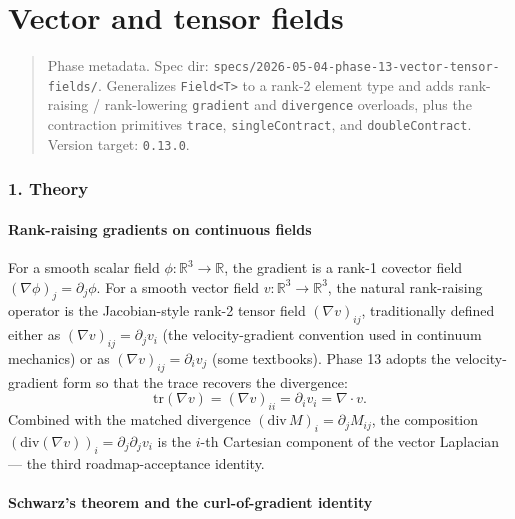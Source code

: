 \chapter{Vector and tensor fields}
\label{chap:dev:vector-tensor-fields}

\begin{quote}
Phase metadata. Spec dir:
\passthrough{\lstinline!specs/2026-05-04-phase-13-vector-tensor-fields/!}.
Generalizes \passthrough{\lstinline!Field<T>!} to a rank-2 element
type and adds rank-raising / rank-lowering
\passthrough{\lstinline!gradient!} and
\passthrough{\lstinline!divergence!} overloads, plus the contraction
primitives \passthrough{\lstinline!trace!},
\passthrough{\lstinline!singleContract!}, and
\passthrough{\lstinline!doubleContract!}. Version target:
\passthrough{\lstinline!0.13.0!}.
\end{quote}

\subsection{1. Theory}\label{phase13-theory}

\subsubsection{Rank-raising gradients on continuous
fields}\label{phase13-continuous}

For a smooth scalar field \(\phi: \mathbb{R}^3 \to \mathbb{R}\), the
gradient is a rank-1 covector field
\((\nabla\phi)_j = \partial_j\phi\). For a smooth vector field
\(v: \mathbb{R}^3 \to \mathbb{R}^3\), the natural rank-raising
operator is the Jacobian-style rank-2 tensor field
\((\nabla v)_{ij}\), traditionally defined either as
\((\nabla v)_{ij} = \partial_j v_i\) (the velocity-gradient
convention used in continuum mechanics) or as
\((\nabla v)_{ij} = \partial_i v_j\) (some textbooks). Phase 13
adopts the velocity-gradient form so that the trace recovers the
divergence:
\[
\mathrm{tr}(\nabla v) = (\nabla v)_{ii} = \partial_i v_i = \nabla\cdot v.
\]
Combined with the matched divergence
\((\mathrm{div}\,M)_i = \partial_j M_{ij}\), the composition
\((\mathrm{div}(\nabla v))_i = \partial_j\partial_j v_i\) is the
\(i\)-th Cartesian component of the vector Laplacian — the third
roadmap-acceptance identity.

\subsubsection{Schwarz's theorem and the
curl-of-gradient identity}\label{phase13-schwarz}

